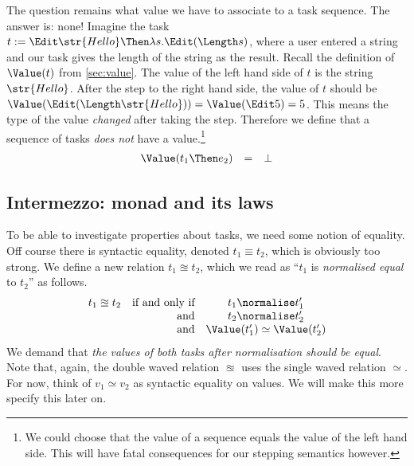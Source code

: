 The question remains what value we have to associate to a task sequence.
The answer is: none!
Imagine the task $t := \Edit \str{Hello} \Then \lambda s.\allowbreak\Edit (\Length s)$,
where a user entered a string and our task gives the length of the string as the result.
Recall the definition of $\Value(t)$ from \autoref{sec:value}.
The value of the left hand side of $t$ is the string $\str{Hello}$.
After the step to the right hand side,
the value of $t$ should be $\Value(\Edit (\Length\str{Hello})) = \Value(\Edit 5) = 5$.
This means the type of the value \emph{changed} after taking the step.
Therefore we define that a sequence of tasks \emph{does not} have a value.\footnote{
  We could choose that the value of a sequence equals the value of the left hand side.
  This will have fatal consequences for our stepping semantics however.
}
\begin{equation*}
  \begin{array}{lcl}
    \Value(t_1 \Then e_2) &=& \bot
  \end{array}
\end{equation*}


\subsection{Intermezzo: monad and its laws}

To be able to investigate properties about tasks,
we need some notion of equality.
Off course there is syntactic equality,
denoted $t_1 \equiv t_2$,
which is obviously too strong.
We define a new relation $t_1 \approxeq t_2$,
which we read as \enquote{$t_1$ is \emph{normalised equal} to $t_2$} as follows.
\begin{equation*}
  \begin{array}{crc}
    t_1 \approxeq t_2 &\text{if and only if}& t_1 \normalise t_1' \\
                      &\text{and}           & t_2 \normalise t_2' \\
                      &\text{and}           & \Value(t_1') \simeq \Value(t_2') \\
  \end{array}
\end{equation*}
We demand that \emph{the values of both tasks after normalisation should be equal}.
Note that, again, the double waved relation $\approxeq$ uses the single waved relation $\simeq$.
For now,
think of $v_1 \simeq v_2$ as syntactic equality on values.
We will make this more specify this later on.

